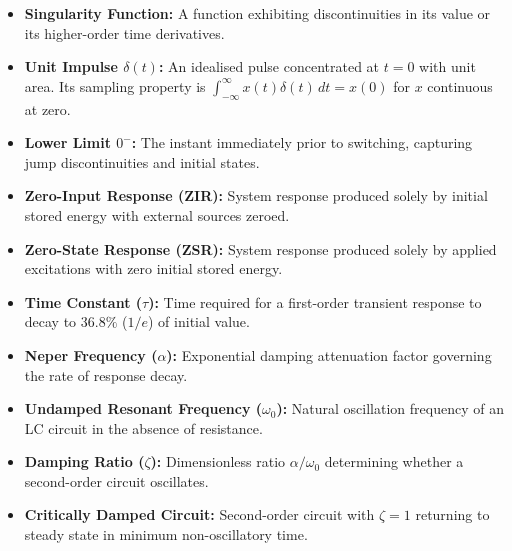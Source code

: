 \documentclass[12pt,a4paper]{article}
\begin{document}
\begin{tcolorbox}[defbox, top=5pt, bottom=5pt, title={\textbf{One-Line Definitions}}]
\begin{itemize}[leftmargin=*, itemsep=1.0pt, topsep=0pt]
  \item \textbf{Singularity Function:} A function exhibiting discontinuities in its value or its higher-order time derivatives.
  \item \textbf{Unit Impulse $\delta(t)$:} An idealised pulse concentrated at $t=0$ with unit area. Its sampling property is $\int_{-\infty}^{\infty}x(t)\delta(t)\,dt=x(0)$ for $x$ continuous at zero.
  \item \textbf{Lower Limit $0^-$:} The instant immediately prior to switching, capturing jump discontinuities and initial states.
  \item \textbf{Zero-Input Response (ZIR):} System response produced solely by initial stored energy with external sources zeroed.
  \item \textbf{Zero-State Response (ZSR):} System response produced solely by applied excitations with zero initial stored energy.
  \item \textbf{Time Constant ($\tau$):} Time required for a first-order transient response to decay to $36.8\%$ ($1/e$) of initial value.
  \item \textbf{Neper Frequency ($\alpha$):} Exponential damping attenuation factor governing the rate of response decay.
  \item \textbf{Undamped Resonant Frequency ($\omega_0$):} Natural oscillation frequency of an LC circuit in the absence of resistance.
  \item \textbf{Damping Ratio ($\zeta$):} Dimensionless ratio $\alpha/\omega_0$ determining whether a second-order circuit oscillates.
  \item \textbf{Critically Damped Circuit:} Second-order circuit with $\zeta=1$ returning to steady state in minimum non-oscillatory time.
\end{itemize}
\end{tcolorbox}
\end{document}
